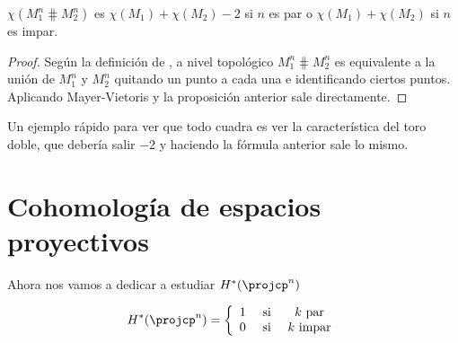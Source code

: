 \documentclass[palatino, bibnumbers]{apuntes}
\begin{document}
\begin{prop} $χ(M_1^n \hash M_2^n)$ es $χ(M_1) + χ(M_2) - 2$ si $n$ es par o $χ(M_1)+ χ(M_2)$ si $n$ es impar.
\end{prop}

\begin{proof} Según la definición de , a nivel topológico $M_1^n \hash M_2^n$ es equivalente a la unión de $M_1^n$ y $M_2^n$ quitando un punto a cada una e identificando ciertos puntos. Aplicando Mayer-Vietoris y la proposición anterior sale directamente.
\end{proof}

Un ejemplo rápido para ver que todo cuadra es ver la característica del toro doble, que debería salir $-2$ y haciendo la fórmula anterior sale lo mismo.

\section{Cohomología de espacios proyectivos}

Ahora nos vamos a dedicar a estudiar $H^\ast(\projcp^n)$

\begin{theorem}
\[
	H^\ast(\projcp^n) =
		\left\{
			\begin{array}{ccc}
				1 & \text{ si } & k \text{ par}\\
				0 & \text{ si } & k \text{ impar}\\
			\end{array}
		\right.
\]
\end{theorem}
\end{document}
